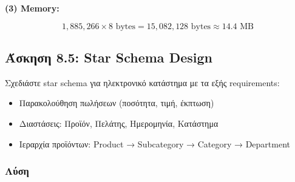 \textbf{(3) Memory:}

$$1,885,266 \times 8 \text{ bytes} = 15,082,128 \text{ bytes} \approx 14.4 \text{ MB}$$

\subsection{Άσκηση 8.5: Star Schema Design}

\begin{formulabox}[Εκφώνηση]
Σχεδιάστε star schema για ηλεκτρονικό κατάστημα με τα εξής requirements:
\begin{itemize}
    \item Παρακολούθηση πωλήσεων (ποσότητα, τιμή, έκπτωση)
    \item Διαστάσεις: Προϊόν, Πελάτης, Ημερομηνία, Κατάστημα
    \item Ιεραρχία προϊόντων: Product → Subcategory → Category → Department
\end{itemize}
\end{formulabox}

\subsubsection*{Λύση}

